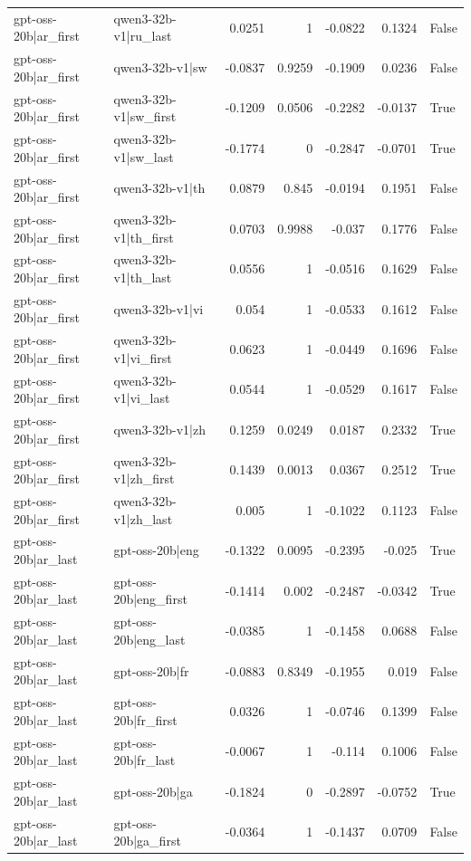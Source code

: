 \begin{table}
\begin{tabular}{l l r r r r l}
gpt-oss-20b|ar_first & qwen3-32b-v1|ru_last & 0.0251 & 1 & -0.0822 & 0.1324 & False \\
gpt-oss-20b|ar_first & qwen3-32b-v1|sw & -0.0837 & 0.9259 & -0.1909 & 0.0236 & False \\
gpt-oss-20b|ar_first & qwen3-32b-v1|sw_first & -0.1209 & 0.0506 & -0.2282 & -0.0137 & True \\
gpt-oss-20b|ar_first & qwen3-32b-v1|sw_last & -0.1774 & 0 & -0.2847 & -0.0701 & True \\
gpt-oss-20b|ar_first & qwen3-32b-v1|th & 0.0879 & 0.845 & -0.0194 & 0.1951 & False \\
gpt-oss-20b|ar_first & qwen3-32b-v1|th_first & 0.0703 & 0.9988 & -0.037 & 0.1776 & False \\
gpt-oss-20b|ar_first & qwen3-32b-v1|th_last & 0.0556 & 1 & -0.0516 & 0.1629 & False \\
gpt-oss-20b|ar_first & qwen3-32b-v1|vi & 0.054 & 1 & -0.0533 & 0.1612 & False \\
gpt-oss-20b|ar_first & qwen3-32b-v1|vi_first & 0.0623 & 1 & -0.0449 & 0.1696 & False \\
gpt-oss-20b|ar_first & qwen3-32b-v1|vi_last & 0.0544 & 1 & -0.0529 & 0.1617 & False \\
gpt-oss-20b|ar_first & qwen3-32b-v1|zh & 0.1259 & 0.0249 & 0.0187 & 0.2332 & True \\
gpt-oss-20b|ar_first & qwen3-32b-v1|zh_first & 0.1439 & 0.0013 & 0.0367 & 0.2512 & True \\
gpt-oss-20b|ar_first & qwen3-32b-v1|zh_last & 0.005 & 1 & -0.1022 & 0.1123 & False \\
gpt-oss-20b|ar_last & gpt-oss-20b|eng & -0.1322 & 0.0095 & -0.2395 & -0.025 & True \\
gpt-oss-20b|ar_last & gpt-oss-20b|eng_first & -0.1414 & 0.002 & -0.2487 & -0.0342 & True \\
gpt-oss-20b|ar_last & gpt-oss-20b|eng_last & -0.0385 & 1 & -0.1458 & 0.0688 & False \\
gpt-oss-20b|ar_last & gpt-oss-20b|fr & -0.0883 & 0.8349 & -0.1955 & 0.019 & False \\
gpt-oss-20b|ar_last & gpt-oss-20b|fr_first & 0.0326 & 1 & -0.0746 & 0.1399 & False \\
gpt-oss-20b|ar_last & gpt-oss-20b|fr_last & -0.0067 & 1 & -0.114 & 0.1006 & False \\
gpt-oss-20b|ar_last & gpt-oss-20b|ga & -0.1824 & 0 & -0.2897 & -0.0752 & True \\
gpt-oss-20b|ar_last & gpt-oss-20b|ga_first & -0.0364 & 1 & -0.1437 & 0.0709 & False \\

\end{tabular}
\end{table}
